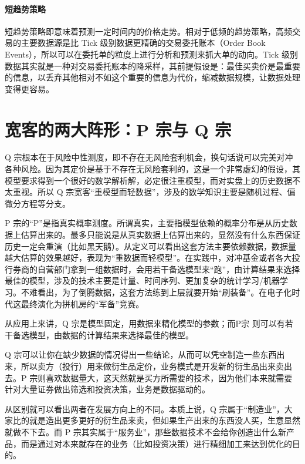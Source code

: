 \paragraph{短趋势策略} 短趋势策略即意味着预测一定时间内的价格走势。相对于低频的趋势策略，高频交易的主要数据源是比 Tick 级别数据更精确的交易委托账本（Order Book Events），所以可以在委托单的粒度上进行分析和预测来抓大单的动向。Tick 级别数据其实就是一种对交易委托账本的降采样，其前提假设是：最佳买卖价是最重要的信息，以丢弃其他相对不如这个重要的信息为代价，缩减数据规模，让数据处理变得更容易。
\section{宽客的两大阵形：P 宗与 Q 宗}
Q 宗根本在于风险中性测度，即不存在无风险套利机会，换句话说可以完美对冲各种风险。因为其定价是基于不存在无风险套利的，这是一个非常虚幻的假设，其模型要求得到一个很好的数学解析解，必定很注重模型，而对实盘上的历史数据不太重视。所以 Q 宗宽客“重模型而轻数据”，涉及的数学知识主要是随机过程、偏微分方程等分支。

P 宗的“P”是指真实概率测度。所谓真实，主要指模型依赖的概率分布是从历史数据上估算出来的。最多只能说是从真实数据上估算出来的，显然没有什么东西保证历史一定会重演（比如黑天鹅）。从定义可以看出这套方法主要依赖数据，数据量越大估算的效果越好，表现为“重数据而轻模型”。在实践中，对冲基金或者各大投行券商的自营部门拿到一组数据时，会用若干备选模型来“跑”，由计算结果来选择最佳的模型，涉及的技术主要是计量、时间序列、更加复杂的统计学习/机器学习。不难看出，为了倒腾数据，这套方法练到上层就要开始“刷装备”。在电子化时代这最终演化为拼机房的“军备”竞赛。

从应用上来讲，Q 宗是模型固定，用数据来精化模型的参数；而P宗
则可以有若干备选模型，由数据的计算结果来选择最佳的模型。

Q 宗可以让你在缺少数据的情况得出一些结论，从而可以凭空制造一些东西出来，所以卖方（投行）用来做衍生品定价，业务模式是开发新的衍生品出来卖出去。P 宗则喜欢数据量大，这天然就是买方所需要的技术，因为他们本来就需要针对大量证券做出筛选和投资决策，业务是数据驱动的。

从区别就可以看出两者在发展方向上的不同。本质上说，Q 宗属于“制造业”，大家比的就是造出更多更好的衍生品来卖，但如果生产出来的东西没人买，生意显然就做不下去。而 P 宗其实属于“服务业”，那些数据技术不会给你创造出什么新产品，而是通过对本来就存在的业务（比如投资决策）进行精细加工来达到优化的目的。